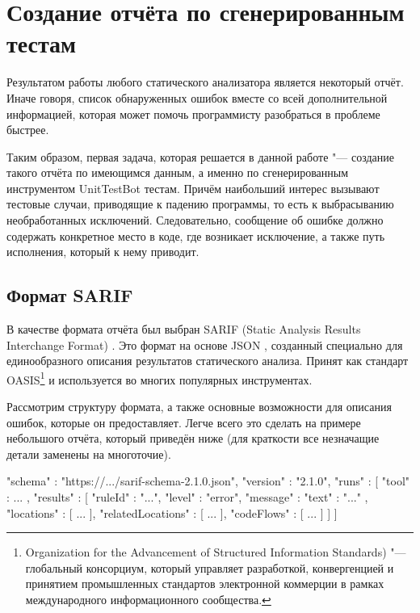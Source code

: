 \section{Создание отчёта по сгенерированным тестам}

Результатом работы любого статического анализатора является некоторый отчёт. Иначе говоря, список обнаруженных ошибок вместе со всей дополнительной информацией, которая может помочь программисту разобраться в проблеме быстрее.

Таким образом, первая задача, которая решается в данной работе "--- создание такого отчёта по имеющимся данным, а именно по сгенерированным инструментом UnitTestBot тестам. Причём наибольший интерес вызывают тестовые случаи, приводящие к падению программы, то есть к выбрасыванию необработанных исключений. Следовательно, сообщение об ошибке должно содержать конкретное место в коде, где возникает исключение, а также путь исполнения, который к нему приводит.

\subsection{Формат SARIF}

В качестве формата отчёта был выбран SARIF (Static Analysis Results Interchange Format) \cite{sarif}. Это формат на основе JSON \cite{json}, созданный специально для единообразного описания результатов статического анализа. Принят как стандарт OASIS\footnote{Organization for the Advancement of Structured Information Standards) "--- глобальный консорциум, который управляет разработкой, конвергенцией и принятием промышленных стандартов электронной коммерции в рамках международного информационного сообщества.} и используется во многих популярных инструментах.

Рассмотрим структуру формата, а также основные возможности для описания ошибок, которые он предоставляет. Легче всего это сделать на примере небольшого отчёта, который приведён ниже (для краткости все незначащие детали заменены на многоточие).

\begin{zerocode}
{
  "schema" : "https://.../sarif-schema-2.1.0.json",
  "version" : "2.1.0",
  "runs" : [
    "tool" : { ... },
    "results" : [ {
      "ruleId" : "...",
      "level" : "error",
      "message" : { "text" : "..." },
      "locations" : [ ... ],
      "relatedLocations" : [ ... ],
      "codeFlows" : [ ... ]
    } ]
  ]
}
\end{zerocode}

